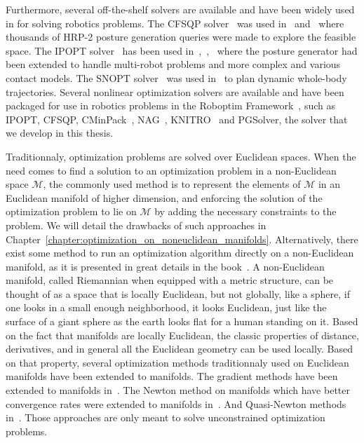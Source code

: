 Furthermore, several off-the-shelf solvers are available and have been widely used in for solving robotics problems.
The CFSQP solver~\cite{cfsqp:manual} was used in~\cite{escande:iros:2009} and~\cite{escande:ras:2013} where thousands of HRP-2 posture generation queries were made to explore the feasible space.
The IPOPT solver~\cite{wachter:mathprog:2006} has been used in~\cite{vaillant:humanoids:2014},~\cite{vaillant:autonomousrobots:2016},~\cite{bouyarmane:ar:2012} where the posture generator had been extended to handle multi-robot problems and more complex and various contact models.
The SNOPT solver~\cite{gill2005snopt} was used in~\cite{dai2014whole} to plan dynamic whole-body trajectories.
Several nonlinear optimization solvers are available and have been packaged for use in robotics problems in the Roboptim Framework~\cite{moulard:jsme:2013}, such as IPOPT, CFSQP, CMinPack~\cite{cminpack}, NAG~\cite{nag}, KNITRO~\cite{knitro} and PGSolver, the solver that we develop in this thesis.

Traditionnaly, optimization problems are solved over Euclidean spaces.
When the need comes to find a solution to an optimization problem in a non-Euclidean space $\mathcal{M}$, the commonly used method is to represent the elements of $\mathcal{M}$ in an Euclidean manifold of higher dimension, and enforcing the solution of the optimization problem to lie on $\mathcal{M}$ by adding the necessary constraints to the problem.
We will detail the drawbacks of such approaches in Chapter~\ref{chapter:optimization_on_noneuclidean_manifolds}.
Alternatively, there exist some method to run an optimization algorithm directly on a non-Euclidean manifold, as it is presented in great details in the book~\cite{absil:book:2008}.
A non-Euclidean manifold, called Riemannian when equipped with a metric structure, can be thought of as a space that is locally Euclidean, but not globally, like a sphere, if one looks in a small enough neighborhood, it looks Euclidean, just like the surface of a giant sphere as the earth looks flat for a human standing on it.
Based on the fact that manifolds are locally Euclidean, the classic properties of distance, derivatives, and in general all the Euclidean geometry can be used locally.
Based on that property, several optimization methods traditionnaly used on Euclidean manifolds have been extended to manifolds.
The gradient methods have been extended to manifolds in~\cite{luenberger1972gradient, gabay1982minimizing}.
The Newton method on manifolds which have better convergence rates were extended to manifolds in~\cite{gabay1982minimizing, stuart1998dynamical, smith2013geometric}.
And Quasi-Newton methods in~\cite{gabay1982minimizing}.
Those approaches are only meant to solve unconstrained optimization problems.

